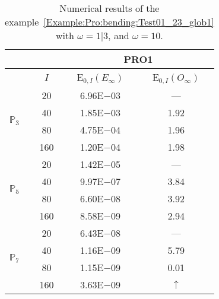 \begin{table}[H]
\caption{Numerical results of the example~\ref{Example:Pro:bending:Test01_23_glob1} with $\omega=1|3$, and $\omega=10$.}
\setlength{\tabcolsep}{5pt}
\centering
\begin{tabular}{@{}l c c c@{}}
\toprule
 &  & \multicolumn{2}{c}{PRO1}\\
\midrule
 & $I$ & E$_{0,I}(E_{\infty})$ & E$_{0,I}(O_{\infty})$\\
\midrule
\multirow{4}{*}{$\mathbb{P}_{3}$} & 20 & 6.96E$-$03 & ---\\
 & 40 & 1.85E$-$03 & 1.92\\
 & 80 & 4.75E$-$04 & 1.96\\
 & 160 & 1.20E$-$04 & 1.98\\
\midrule
\multirow{4}{*}{$\mathbb{P}_{5}$} & 20 & 1.42E$-$05 & ---\\
 & 40 & 9.97E$-$07 & 3.84\\
 & 80 & 6.60E$-$08 & 3.92\\
 & 160 & 8.58E$-$09 & 2.94\\
\midrule
\multirow{4}{*}{$\mathbb{P}_{7}$} & 20 & 6.43E$-$08 & ---\\
 & 40 & 1.16E$-$09 & 5.79\\
 & 80 & 1.15E$-$09 & 0.01\\
 & 160 & 3.63E$-$09 & $\uparrow$\\
\bottomrule
\end{tabular}
\label{Table:PRO:test_01_23_test16}
\end{table}
